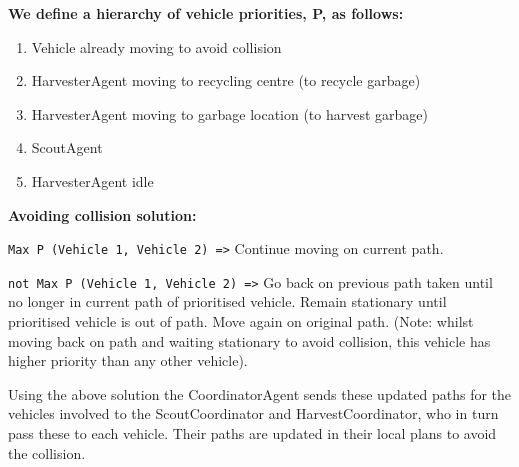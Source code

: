 \textbf{We define a hierarchy of vehicle priorities, P, as follows:}

\begin{enumerate}
	\item Vehicle already moving to avoid collision
	\item HarvesterAgent moving to recycling centre (to recycle garbage)
	\item HarvesterAgent moving to garbage location (to harvest garbage)
	\item ScoutAgent 
	\item HarvesterAgent idle 
\end{enumerate}

\textbf{Avoiding collision solution:}


\texttt{Max P (Vehicle 1, Vehicle 2) =>} Continue moving on current path.

\texttt{not Max P (Vehicle 1, Vehicle 2) =>} Go back on previous path taken until no longer in current path of prioritised vehicle. Remain stationary until prioritised vehicle is out of path. Move again on original path. (Note: whilst moving back on path and waiting stationary to avoid collision, this vehicle has higher priority than any other vehicle).

Using the above solution the CoordinatorAgent sends these updated paths for the vehicles involved to the ScoutCoordinator and HarvestCoordinator, who in turn pass these to each vehicle. Their paths are updated in their local plans to avoid the collision.  








